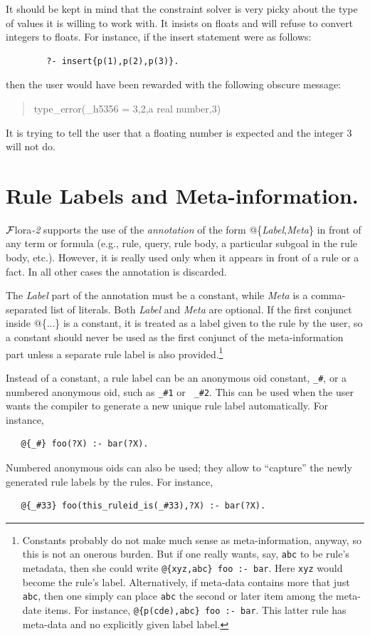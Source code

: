 \documentclass[11pt]{article}
\newcommand{\FLORA}{{\mbox{\sc ${\cal F}${lora}\rm\emph{-2}}}\xspace}
\begin{document}
It should be kept in mind that the constraint solver is very picky about
the type of values it is willing to work with. It insists on floats and
will refuse to convert integers to floats. For instance, if the insert
statement were as follows:
\begin{verbatim}
        ?- insert{p(1),p(2),p(3)}.  
\end{verbatim}
then the user would have been rewarded with the following obscure message:
\begin{quote}
  type\_error(\_h5356 = 3,2,a real number,3)
\end{quote}
It is trying to tell the user that a floating number is expected and the
integer 3 will not do.


\section{Rule Labels and Meta-information.}
\label{sec-rule-label}

\FLORA supports the use of the \emph{annotation} of the form
@\{\emph{Label},\emph{Meta}\} in front of any term or formula (e.g., rule,
query, rule body, a particular subgoal in the rule body, etc.). However,
it is really used only when it appears in front of a rule or a fact.
In all other cases the annotation is discarded.

The \emph{Label} part of the annotation
must be a constant, while \emph{Meta} is a comma-separated list of literals.
Both \emph{Label} and \emph{Meta} are optional. If the first conjunct
inside @\{...\} is a constant, it is treated as a label given
to the rule by the user,
so a constant should never be used as the first conjunct of the
meta-information part unless a separate rule label is also provided.\footnote{
  Constants probably do not make much sense as meta-information, anyway,
  so this is not an onerous burden.
But if one really wants, say, {\tt abc} to be rule's metadata, then she
could write {\tt @\{xyz,abc\} foo :- bar}. Here {\tt xyz} would
become the rule's label. Alternatively, if meta-data contains 
more that just {\tt abc}, then one simply can place {\tt abc} the second or
later item among the meta-date items. For instance, {\tt @\{p(cde),abc\} foo
  :- bar}.  This latter rule has meta-data and no explicitly given label label.
}


Instead of a constant, a rule label can be an anonymous oid constant,
{\tt \_\#}, or a numbered anonymous oid, such as {\tt \_\#1} or {\tt
  \_\#2}. This can be used when the user wants the compiler to generate a
new unique rule label automatically. For instance,
\begin{verbatim}
   @{_#} foo(?X) :- bar(?X).
\end{verbatim}
Numbered anonymous oids can also be used;
they allow to ``capture'' the newly generated
rule labels by the rules. For instance,
\begin{verbatim}
   @{_#33} foo(this_ruleid_is(_#33),?X) :- bar(?X).
\end{verbatim}
\end{document}
